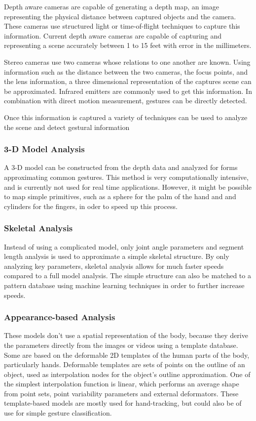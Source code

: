 \documentclass[11pt]{report}
\begin{document}
Depth aware cameras are capable of generating a depth map, an image representing the physical distance between captured objects and the camera.
These cameras use structured light or time-of-flight techniques to capture this information.
Current depth aware cameras are capable of capturing and representing a scene accurately between 1 to 15 feet with error in the millimeters.

Stereo cameras use two cameras whose relations to one another are known. 
Using information such as the distance between the two cameras, the focus points, and the lens information, a three dimensional representation of the captures scene can be approximated. 
Infrared emitters are commonly used to get this information.
In combination with direct motion measurement, gestures can be directly detected.

Once this information is captured a variety of techniques can be used to analyze the scene and detect gestural information

\subsubsection{3-D Model Analysis}

A 3-D model can be constructed from the depth data and analyzed for forms approximating common gestures. 
This method is very computationally intensive, and is currently not used for real time applications.
However, it might be possible to map simple primitives, such as a sphere for the palm of the hand and and cylinders for the fingers, in oder to speed up this process.

\subsubsection{Skeletal Analysis}

Instead of using a complicated model, only joint angle parameters and segment length analysis is used to approximate a simple skeletal structure. By only analyzing key parameters, skeletal analysis allows for much faster speeds compared to a full model analysis.
The simple structure can also be matched to a pattern database using machine learning techniques in order to further increase speeds.

\subsubsection{Appearance-based Analysis}

These models don’t use a spatial representation of the body, because they derive the parameters directly from the images or videos using a template database. 
Some are based on the deformable 2D templates of the human parts of the body, particularly hands.
Deformable templates are sets of points on the outline of an object, used as interpolation nodes for the object’s outline approximation. 
One of the simplest interpolation function is linear, which performs an average shape from point sets, point variability parameters and external deformators. 
These template-based models are mostly used for hand-tracking, but could also be of use for simple gesture classification.
\end{document}
